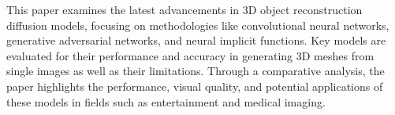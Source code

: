 This paper examines the latest advancements in 3D object reconstruction diffusion models, focusing on methodologies like convolutional neural networks, generative adversarial networks, and neural implicit functions.
Key models are evaluated for their performance and accuracy in generating 3D meshes from single images as well as their limitations. Through a comparative analysis, the paper highlights the performance, visual quality, and potential applications of these models in fields such as entertainment and medical imaging.